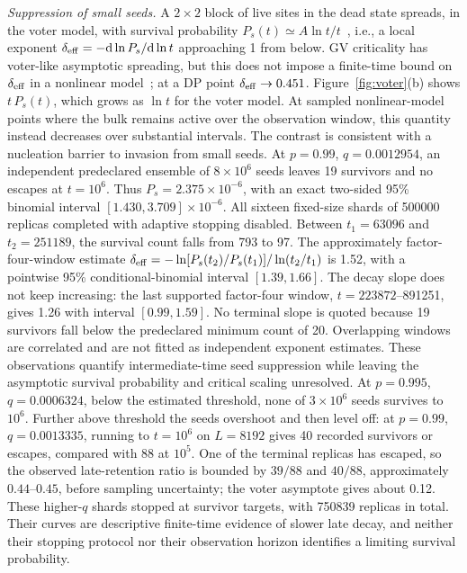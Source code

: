 \documentclass[pre,twocolumn,superscriptaddress,showpacs,floatfix]{revtex4-2}
\newcommand{\ds}{\mathrm{d}}
\begin{document}
\textit{Suppression of small seeds.} A $2\times2$ block of live sites in the dead state
spreads, in the voter model, with survival probability $P_s(t)\simeq A\ln t/t$~\cite{bramson1980},
i.e., a local exponent $\delta_{\rm eff} = -\ds\ln P_s/\ds\ln t$ approaching 1 from below. GV criticality has voter-like asymptotic spreading, but this does not impose a finite-time bound on $\delta_{\rm eff}$ in a nonlinear model~\cite{castellano2012,azizi2020}; at a DP point $\delta_{\rm eff}\to0.451$. Figure~\ref{fig:voter}(b)
shows $t\,P_s(t)$, which grows as $\ln t$ for the voter model. At sampled
nonlinear-model points where the bulk remains active over the observation
window, this quantity instead decreases over substantial intervals.
The contrast is consistent with a nucleation barrier to invasion from
small seeds. At $p=0.99$, $q=0.0012954$, an independent predeclared
ensemble of $8\times10^6$ seeds leaves 19 survivors and no escapes at
$t=10^6$. Thus $P_s=2.375\times10^{-6}$, with an exact two-sided 95\%
binomial interval $[1.430,3.709]\times10^{-6}$. All sixteen fixed-size
shards of 500000 replicas completed with adaptive stopping disabled.
Between $t_1=63096$ and $t_2=251189$, the survival count falls from
793 to 97. The approximately factor-four-window estimate
$\delta_{\rm eff}=-\ln[P_s(t_2)/P_s(t_1)]/\ln(t_2/t_1)$ is 1.52,
with a pointwise 95\% conditional-binomial interval $[1.39,1.66]$.
The decay slope does not keep increasing: the last supported factor-four
window, $t=223872$--891251, gives 1.26 with interval $[0.99,1.59]$.
No terminal slope is quoted because 19 survivors fall below the
predeclared minimum count of 20. Overlapping windows are correlated
and are not fitted as independent exponent estimates. These observations
quantify intermediate-time seed suppression while leaving the asymptotic
survival probability and critical scaling unresolved.
At $p=0.995$, $q=0.0006324$, below the estimated threshold, none of
$3\times10^6$ seeds survives to $10^6$. Further above threshold the seeds
overshoot and then level off: at $p=0.99$, $q=0.0013335$, running to
$t=10^6$ on $L=8192$ gives 40 recorded survivors or escapes, compared with
88 at $10^5$. One of the terminal replicas has escaped, so the observed
late-retention ratio is bounded by $39/88$ and $40/88$, approximately
$0.44$--$0.45$, before sampling uncertainty; the voter asymptote gives
about 0.12. These higher-$q$ shards stopped at survivor targets, with
750839 replicas in total. Their curves are descriptive finite-time
evidence of slower late decay, and neither their stopping protocol nor
their observation horizon identifies a limiting survival probability.
\end{document}
